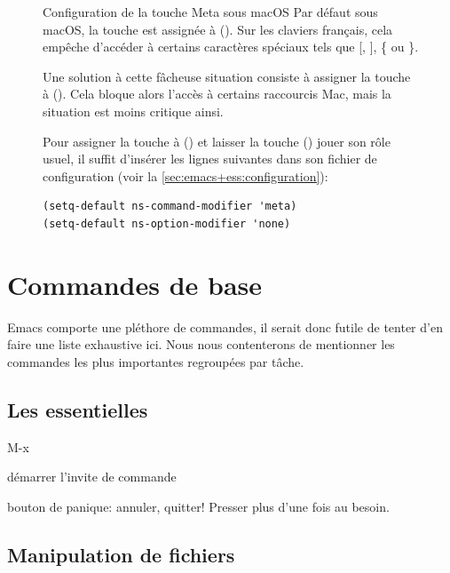\begin{figure}[t]
  \begin{emphbox}{\mdseries Configuration de la touche Meta sous macOS}
    Par défaut sous macOS, la touche  est assignée à
     (\optkey). Sur les claviers français, cela empêche
    d'accéder à certains caractères spéciaux tels que [, ], \{ ou \}.

    Une solution à cette fâcheuse situation consiste à assigner
    la touche  à  (\cmdkey). Cela bloque
    alors l'accès à certains raccourcis Mac, mais la situation est
    moins critique ainsi.

    Pour assigner la touche  à  (\cmdkey) et
    laisser la touche  (\optkey) jouer son rôle usuel, il
    suffit d'insérer les lignes suivantes dans son fichier de
    configuration  (voir la
    \autoref{sec:emacs+ess:configuration}):
\begin{verbatim}
(setq-default ns-command-modifier 'meta)
(setq-default ns-option-modifier 'none)
\end{verbatim}
  \end{emphbox}
  \label{fig:ess:meta}
\end{figure}



\section{Commandes de base}
\label{sec:emacs+ess:commandes}

Emacs comporte une pléthore de commandes, il serait donc futile de
tenter d'en faire une liste exhaustive ici. Nous nous contenterons de
mentionner les commandes les plus importantes regroupées par tâche.

\subsection{Les essentielles}
\label{sec:emacs+ess:commandes:essentielles}

\begin{ttscript}{M-x}
\item[\code{M-x}] démarrer l'invite de commande
\item[\code{C-g}] bouton de panique: annuler, quitter! Presser plus
  d'une fois au besoin.
\end{ttscript}

\subsection{Manipulation de fichiers}
\label{sec:emacs+ess:commandes:fichiers}

